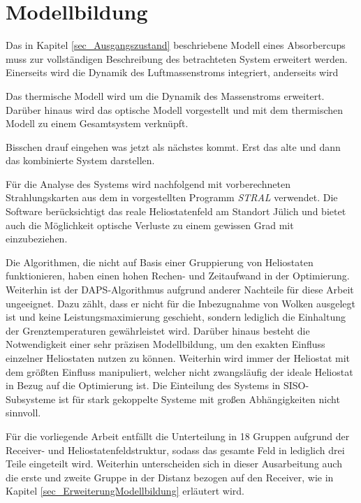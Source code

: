 \chapter{Modellbildung} \label{ch_Modellbildung}
Das in Kapitel \ref{sec_Ausgangszustand} beschriebene Modell eines Absorbercups muss zur vollständigen Beschreibung des betrachteten System erweitert werden.
Einerseits wird die Dynamik des Luftmassenstroms integriert, anderseits wird

Das thermische Modell wird um die Dynamik des Massenstroms erweitert.
Darüber hinaus wird das optische Modell vorgestellt und mit dem thermischen Modell zu einem Gesamtsystem verknüpft.



Bisschen drauf eingehen was jetzt als nächstes kommt.
Erst das alte und dann das kombinierte System darstellen.

Für die Analyse des Systems wird nachfolgend mit vorberechneten Strahlungskarten aus dem in \cite[S.53ff]{DissBelhomme} vorgestellten Programm \textit{STRAL} verwendet.
Die Software berücksichtigt das reale Heliostatenfeld am Standort Jülich und bietet auch die Möglichkeit optische Verluste zu einem gewissen Grad mit einzubeziehen.

Die Algorithmen, die nicht auf Basis einer Gruppierung von Heliostaten funktionieren, haben einen hohen Rechen- und Zeitaufwand in der Optimierung.
Weiterhin ist der DAPS-Algorithmus aufgrund anderer Nachteile für diese Arbeit ungeeignet.
Dazu zählt, dass er nicht für die Inbezugnahme von Wolken ausgelegt ist und keine Leistungsmaximierung geschieht, sondern lediglich die Einhaltung der Grenztemperaturen gewährleistet wird.
Darüber hinaus besteht die Notwendigkeit einer sehr präzisen Modellbildung, um den exakten Einfluss einzelner Heliostaten nutzen zu können.
Weiterhin wird immer der Heliostat mit dem größten Einfluss manipuliert, welcher nicht zwangsläufig der ideale Heliostat in Bezug auf die Optimierung ist. \cite[S.35]{DissOberkirsch}
Die Einteilung des Systems in SISO-Subsysteme ist für stark gekoppelte Systeme mit großen Abhängigkeiten nicht sinnvoll. \cite[S.33]{DissZanger}

Für die vorliegende Arbeit entfällt die Unterteilung in 18 Gruppen aufgrund der Receiver- und Heliostatenfeldstruktur, sodass das gesamte Feld in lediglich drei Teile eingeteilt wird.
Weiterhin unterscheiden sich in dieser Ausarbeitung auch die erste und zweite Gruppe in der Distanz bezogen auf den Receiver, wie in Kapitel \ref{sec_ErweiterungModellbildung} erläutert wird.



